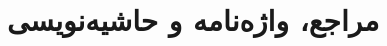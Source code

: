 \chapter{مراجع، واژه‌نامه و حاشیه‌نویسی}
\label{app:refMan}
\thispagestyle{empty}
\TaskImagesCommand



